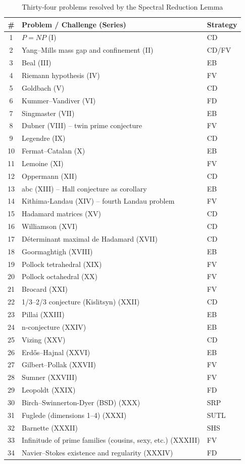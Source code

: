 \documentclass[11pt,a4paper]{article}
\begin{document}
\begin{center}
\begin{longtable}{@{}cll@{}}
\caption{Thirty‑four problems resolved by the Spectral Reduction Lemma}\\
\toprule
\# & Problem / Challenge (Series) & Strategy \\
\midrule
1 & \(P = NP\) (I) & CD \\
2 & Yang–Mills mass gap and confinement (II) & CD/FV \\
3 & Beal (III) & EB \\
4 & Riemann hypothesis (IV) & FV \\
5 & Goldbach (V) & CD \\
6 & Kummer–Vandiver (VI) & FD \\
7 & Singmaster (VII) & EB \\
8 & Dubner (VIII) – twin prime conjecture & FV \\
9 & Legendre (IX) & CD \\
10 & Fermat–Catalan (X) & EB \\
11 & Lemoine (XI) & FV \\
12 & Oppermann (XII) & CD \\
13 & abc (XIII) – Hall conjecture as corollary & EB \\
14 & Kithima‑Landau (XIV) – fourth Landau problem & FV \\
15 & Hadamard matrices (XV) & CD \\
16 & Williamson (XVI) & CD \\
17 & Déterminant maximal de Hadamard (XVII) & CD \\
18 & Goormaghtigh (XVIII) & EB \\
19 & Pollock tetrahedral (XIX) & FV \\
20 & Pollock octahedral (XX) & FV \\
21 & Brocard (XXI) & FV \\
22 & 1/3–2/3 conjecture (Kislitsyn) (XXII) & CD \\
23 & Pillai (XXIII) & EB \\
24 & n‑conjecture (XXIV) & EB \\
25 & Vizing (XXV) & CD \\
26 & Erdős–Hajnal (XXVI) & EB \\
27 & Gilbert–Pollak (XXVII) & FV \\
28 & Sumner (XXVIII) & FV \\
29 & Leopoldt (XXIX) & FD \\
30 & Birch–Swinnerton-Dyer (BSD) (XXX) & SRP \\
31 & Fuglede (dimensions 1–4) (XXXI) & SUTL \\
32 & Barnette (XXXII) & SHS \\
33 & Infinitude of prime families (cousins, sexy, etc.) (XXXIII) & FV \\
34 & Navier–Stokes existence and regularity (XXXIV) & FD \\
\bottomrule
\end{longtable}
\end{center}
\end{document}
